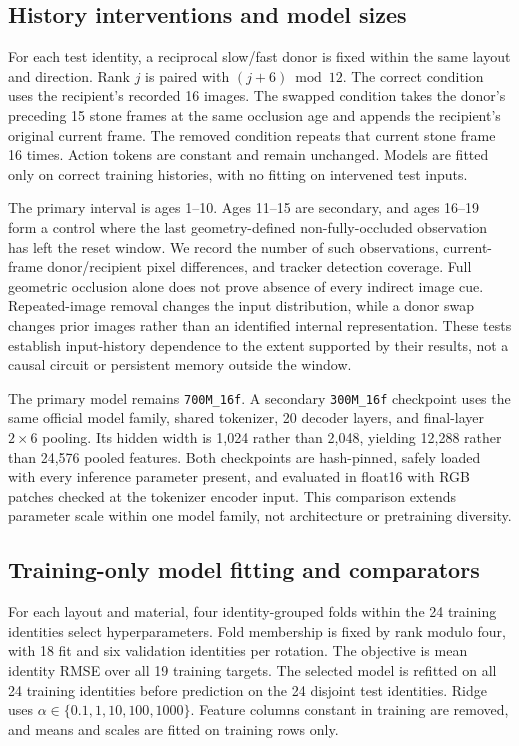 \subsection{History interventions and model sizes}
For each test identity, a reciprocal slow/fast donor is fixed within the same layout and direction. Rank $j$ is paired with $(j+6)\bmod 12$. The correct condition uses the recipient's recorded 16 images. The swapped condition takes the donor's preceding 15 stone frames at the same occlusion age and appends the recipient's original current frame. The removed condition repeats that current stone frame 16 times. Action tokens are constant and remain unchanged. Models are fitted only on correct training histories, with no fitting on intervened test inputs.

The primary interval is ages 1--10. Ages 11--15 are secondary, and ages 16--19 form a control where the last geometry-defined non-fully-occluded observation has left the reset window. We record the number of such observations, current-frame donor/recipient pixel differences, and tracker detection coverage. Full geometric occlusion alone does not prove absence of every indirect image cue. Repeated-image removal changes the input distribution, while a donor swap changes prior images rather than an identified internal representation. These tests establish input-history dependence to the extent supported by their results, not a causal circuit or persistent memory outside the window.

The primary model remains \texttt{700M\_16f}. A secondary \texttt{300M\_16f} checkpoint uses the same official model family, shared tokenizer, 20 decoder layers, and final-layer $2\times6$ pooling. Its hidden width is 1,024 rather than 2,048, yielding 12,288 rather than 24,576 pooled features. Both checkpoints are hash-pinned, safely loaded with every inference parameter present, and evaluated in float16 with RGB patches checked at the tokenizer encoder input. This comparison extends parameter scale within one model family, not architecture or pretraining diversity.

\subsection{Training-only model fitting and comparators}
For each layout and material, four identity-grouped folds within the 24 training identities select hyperparameters. Fold membership is fixed by rank modulo four, with 18 fit and six validation identities per rotation. The objective is mean identity RMSE over all 19 training targets. The selected model is refitted on all 24 training identities before prediction on the 24 disjoint test identities. Ridge uses $\alpha\in\{0.1,1,10,100,1000\}$. Feature columns constant in training are removed, and means and scales are fitted on training rows only.

